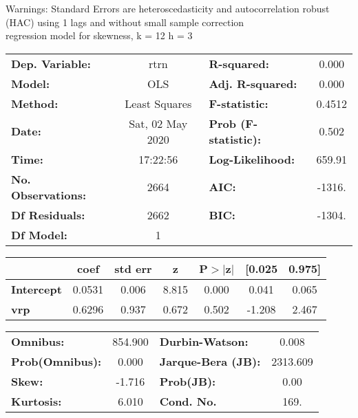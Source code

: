 Warnings: \newline
 [1] Standard Errors are heteroscedasticity and autocorrelation robust (HAC) using 1 lags and without small sample correction\\ 

regression model for skewness, k = 12 h = 3\begin{center}
\begin{tabular}{lclc}
\toprule
\textbf{Dep. Variable:}    &       rtrn       & \textbf{  R-squared:         } &     0.000   \\
\textbf{Model:}            &       OLS        & \textbf{  Adj. R-squared:    } &     0.000   \\
\textbf{Method:}           &  Least Squares   & \textbf{  F-statistic:       } &    0.4512   \\
\textbf{Date:}             & Sat, 02 May 2020 & \textbf{  Prob (F-statistic):} &    0.502    \\
\textbf{Time:}             &     17:22:56     & \textbf{  Log-Likelihood:    } &    659.91   \\
\textbf{No. Observations:} &        2664      & \textbf{  AIC:               } &    -1316.   \\
\textbf{Df Residuals:}     &        2662      & \textbf{  BIC:               } &    -1304.   \\
\textbf{Df Model:}         &           1      & \textbf{                     } &             \\
\bottomrule
\end{tabular}
\begin{tabular}{lcccccc}
                   & \textbf{coef} & \textbf{std err} & \textbf{z} & \textbf{P$> |$z$|$} & \textbf{[0.025} & \textbf{0.975]}  \\
\midrule
\textbf{Intercept} &       0.0531  &        0.006     &     8.815  &         0.000        &        0.041    &        0.065     \\
\textbf{vrp}       &       0.6296  &        0.937     &     0.672  &         0.502        &       -1.208    &        2.467     \\
\bottomrule
\end{tabular}
\begin{tabular}{lclc}
\textbf{Omnibus:}       & 854.900 & \textbf{  Durbin-Watson:     } &    0.008  \\
\textbf{Prob(Omnibus):} &   0.000 & \textbf{  Jarque-Bera (JB):  } & 2313.609  \\
\textbf{Skew:}          &  -1.716 & \textbf{  Prob(JB):          } &     0.00  \\
\textbf{Kurtosis:}      &   6.010 & \textbf{  Cond. No.          } &     169.  \\
\bottomrule
\end{tabular}
\end{center}


